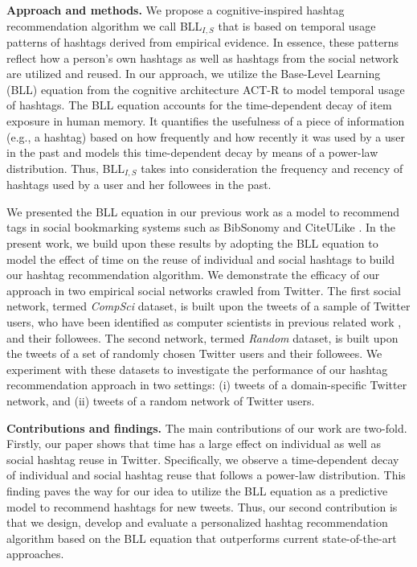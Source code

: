\documentclass{sig-alternate-05-2015}
\newcommand{\para}[1]{\vspace{2mm}\noindent\textbf{#1}}
\begin{document}
\para{Approach and methods.} We propose a cognitive-inspired hashtag recommendation algorithm we call BLL$_{I,S}${} that is based on temporal usage patterns of hashtags derived from empirical evidence. In essence, these patterns reflect how a person's own hashtags as well as hashtags from the social network are utilized and reused. In our approach, we utilize the Base-Level Learning (BLL) equation from the cognitive architecture ACT-R \cite{anderson2004integrated,anderson_reflections_1991} to model temporal usage of hashtags. The BLL equation accounts for the time-dependent decay of item exposure in human memory. It quantifies the usefulness of a piece of information (e.g., a hashtag) based on how frequently and how recently it was used by a user in the past and models this time-dependent decay by means of a power-law distribution. Thus, BLL$_{I,S}${} takes into consideration the frequency and recency of hashtags used by a user and her followees in the past. 

We presented the BLL equation in our previous work as a model to recommend tags in social bookmarking systems such as BibSonomy and CiteULike \cite{www_bll, Kowald2016a}. In the present work, we build upon these results by adopting the BLL equation to model the effect of time on the reuse of individual and social hashtags to build our hashtag recommendation algorithm. We demonstrate the efficacy of our approach in two empirical social networks crawled from Twitter. The first social network, termed \textit{CompSci}{} dataset, is built upon the tweets of a sample of Twitter users, who have been identified as computer scientists in previous related work \cite{hadgu2014identifying}, and their followees. The second network, termed \textit{Random}{} dataset, is built upon the tweets of a set of randomly chosen Twitter users and their followees. We experiment with these datasets to investigate the performance of our hashtag recommendation approach in two settings: (i) tweets of a domain-specific Twitter network, and (ii) tweets of a random network of Twitter users.

\para{Contributions and findings.} The main contributions of our work are two-fold. Firstly, our paper shows that time has a large effect on individual as well as social hashtag reuse in Twitter. Specifically, we observe a time-dependent decay of individual and social hashtag reuse that follows a power-law distribution. This finding paves the way for our idea to utilize the BLL equation as a predictive model to recommend hashtags for new tweets. Thus, our second contribution is that we design, develop and evaluate a personalized hashtag recommendation algorithm based on the BLL equation that outperforms current state-of-the-art approaches.
\end{document}
